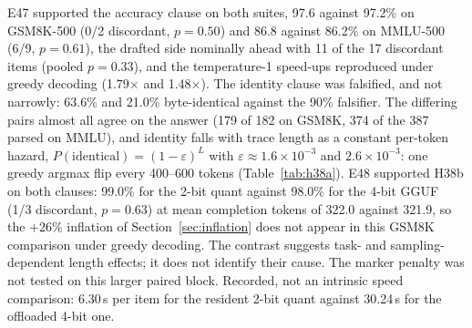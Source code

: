 \documentclass[11pt]{article}
\begin{document}
E47 supported the accuracy clause on both suites, 97.6 against 97.2\% on
GSM8K-500 (0/2 discordant, $p=0.50$) and 86.8 against 86.2\% on MMLU-500
(6/9, $p=0.61$), the drafted side nominally ahead with 11 of the 17
discordant items (pooled $p=0.33$), and the temperature-1 speed-ups
reproduced under greedy decoding (1.79$\times$ and 1.48$\times$). The
identity clause was falsified, and not narrowly: 63.6\% and 21.0\%
byte-identical against the 90\% falsifier. The differing pairs almost all
agree on the answer (179 of 182 on GSM8K, 374 of the 387 parsed on MMLU),
and identity falls with trace length as a constant per-token hazard,
$P(\text{identical})=(1-\varepsilon)^L$ with $\varepsilon\approx1.6\times10^{-3}$
and $2.6\times10^{-3}$: one greedy argmax flip every 400--600 tokens
(Table~\ref{tab:h38a}). E48
supported H38b on both clauses: 99.0\% for the 2-bit quant against 98.0\% for
the 4-bit GGUF (1/3 discordant, $p=0.63$) at mean completion tokens of 322.0
against 321.9, so the $+26\%$ inflation of Section~\ref{sec:inflation} does
not appear in this GSM8K comparison under greedy decoding. The contrast
suggests task- and sampling-dependent length effects; it does not identify
their cause. The marker penalty was not tested on this larger paired block.
Recorded, not an intrinsic speed comparison: 6.30\,s per item
for the resident 2-bit quant against 30.24\,s for the offloaded 4-bit one.
\end{document}
